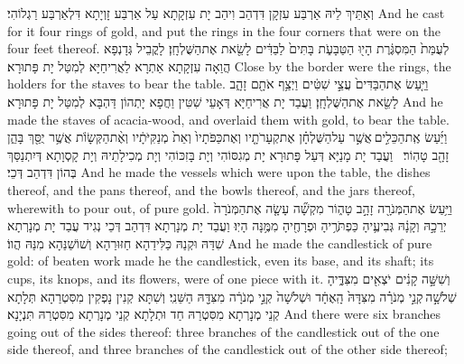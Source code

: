 {וְאַתֵּיךְ לֵיהּ אַרְבַּע עִזְקָן דִּדְהַב וִיהַב יָת עִזְקָתָא עַל אַרְבַּע זָוְיָתָא דִּלְאַרְבַּע רַגְלוֹהִי׃}
{And he cast for it four rings of gold, and put the rings in the four corners that were on the four feet thereof.}{}
{לְעֻמַּת֙ הַמִּסְגֶּ֔רֶת הָי֖וּ הַטַּבָּעֹ֑ת בָּתִּים֙ לַבַּדִּ֔ים לָשֵׂ֖את אֶת\maqqaf הַשֻּׁלְחָֽן׃}
{לָקֳבֵיל גְּדָנְפָא הֲוַאָה עִזְקָתָא אַתְרָא לַאֲרִיחַיָּא לְמִטַּל יָת פָּתוּרָא׃}
{Close by the border were the rings, the holders for the staves to bear the table.}{}
{וַיַּ֤עַשׂ אֶת\maqqaf הַבַּדִּים֙ עֲצֵ֣י שִׁטִּ֔ים וַיְצַ֥ף אֹתָ֖ם זָהָ֑ב לָשֵׂ֖את אֶת\maqqaf הַשֻּׁלְחָֽן׃}
{וַעֲבַד יָת אֲרִיחַיָּא דְּאָעֵי שִׁטִּין וַחֲפָא יָתְהוֹן דַּהְבָּא לְמִטַּל יָת פָּתוּרָא׃}
{And he made the staves of acacia-wood, and overlaid them with gold, to bear the table.}{}
{וַיַּ֜עַשׂ אֶֽת\maqqaf הַכֵּלִ֣ים \legarmeh  אֲשֶׁ֣ר עַל\maqqaf הַשֻּׁלְחָ֗ן אֶת\maqqaf קְעָרֹתָ֤יו וְאֶת\maqqaf כַּפֹּתָיו֙ וְאֵת֙ מְנַקִּיֹּתָ֔יו וְאֶ֨ת\maqqaf הַקְּשָׂוֺ֔ת אֲשֶׁ֥ר יֻסַּ֖ךְ בָּהֵ֑ן זָהָ֖ב טָהֽוֹר׃ \petucha }
{וַעֲבַד יָת מָנַיָּא דְּעַל פָּתוּרָא יָת מְגִסּוֹהִי וְיָת בָּזִכּוֹהִי וְיָת מְכִילָתֵיהּ וְיָת קָסְוָתָא דְּיִתְנַסַּךְ בְּהוֹן דִּדְהַב דְּכֵי׃}
{And he made the vessels which were upon the table, the dishes thereof, and the pans thereof, and the bowls thereof, and the jars thereof, wherewith to pour out, of pure gold.}{}
{וַיַּ֥עַשׂ אֶת\maqqaf הַמְּנֹרָ֖ה זָהָ֣ב טָה֑וֹר מִקְשָׁ֞ה עָשָׂ֤ה אֶת\maqqaf הַמְּנֹרָה֙ יְרֵכָ֣הּ וְקָנָ֔הּ גְּבִיעֶ֛יהָ כַּפְתֹּרֶ֥יהָ וּפְרָחֶ֖יהָ מִמֶּ֥נָּה הָיֽוּ׃}
{וַעֲבַד יָת מְנָרְתָא דִּדְהַב דְּכֵי נְגִיד עֲבַד יָת מְנָרְתָא שִׁדַּהּ וּקְנַהּ כַּלִּידַהָא חַזּוּרַהָא וְשׁוֹשַׁנַּהָא מִנַּהּ הֲווֹ׃}
{And he made the candlestick of pure gold: of beaten work made he the candlestick, even its base, and its shaft; its cups, its knops, and its flowers, were of one piece with it.}{}
{וְשִׁשָּׁ֣ה קָנִ֔ים יֹצְאִ֖ים מִצִּדֶּ֑יהָ שְׁלֹשָׁ֣ה \legarmeh  קְנֵ֣י מְנֹרָ֗ה מִצִּדָּהּ֙ הָֽאֶחָ֔ד וּשְׁלֹשָׁה֙ קְנֵ֣י מְנֹרָ֔ה מִצִּדָּ֖הּ הַשֵּׁנִֽי׃}
{וְשִׁתָּא קְנִין נָפְקִין מִסִּטְרַהָא תְּלָתָא קְנֵי מְנָרְתָא מִסִּטְרַהּ חַד וּתְלָתָא קְנֵי מְנָרְתָא מִסִּטְרַהּ תִּנְיָנָא׃}
{And there were six branches going out of the sides thereof: three branches of the candlestick out of the one side thereof, and three branches of the candlestick out of the other side thereof;}{}
